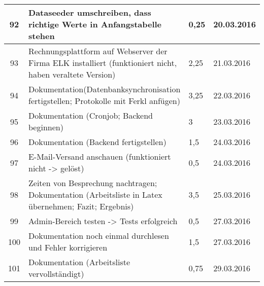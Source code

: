 \begin{longtable}[h]{| c | p{11.6cm} | l | l |}
92 & Dataseeder umschreiben, dass richtige Werte in Anfangstabelle stehen & 0,25 & 20.03.2016 \\ \hline
93 & Rechnungsplattform auf Webserver der Firma ELK installiert (funktioniert nicht, haben veraltete Version) & 2,25 & 21.03.2016 \\ \hline
94 & Dokumentation(Datenbanksynchronisation fertigstellen; Protokolle mit Ferkl anfügen) & 3,25 & 22.03.2016 \\ \hline
95 & Dokumentation (Cronjob; Backend beginnen) & 3 & 23.03.2016 \\ \hline
96 & Dokumentation (Backend fertigstellen) & 1,5 & 24.03.2016 \\ \hline
97 & E-Mail-Versand anschauen (funktioniert nicht -> gelöst) & 0,5 & 24.03.2016 \\ \hline
98 & Zeiten von Besprechung nachtragen; Dokumentation (Arbeitsliste in Latex übernehmen; Fazit; Ergebnis) & 3,5 & 25.03.2016 \\ \hline
99 & Admin-Bereich testen -> Tests erfolgreich & 0,5 & 27.03.2016 \\ \hline
100 & Dokumentation noch einmal durchlesen und Fehler korrigieren & 1,5 & 27.03.2016 \\ \hline
101 & Dokumentation (Arbeitsliste vervollständigt) & 0,75 & 29.03.2016 \\ \hline

\end{longtable}